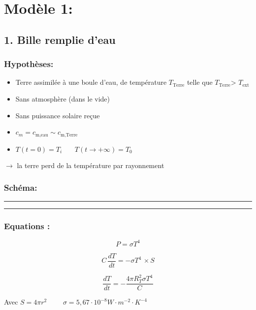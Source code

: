 \documentclass[a4paper,12pt]{article}
\begin{document}
\section*{Modèle 1:}
\subsection*{1. Bille remplie d'eau}
\subsubsection*{Hypothèses:}
\begin{itemize}
    \item Terre assimilée à une boule d'eau, de température \(T_{\text{Terre}}\) telle que \(T_{\text{Terre}}\)> \(T_{\text{ext}}\)
    \item  Sans atmosphère (dans le vide)
    \item  Sans puissance solaire reçue  
    \item \(c_{m}= c_{\text{m,eau}} \sim c_{\text{m,Terre}}\) 
    \item $T(t=0) = T_i$ \ \ \
$T(t \to +\infty) = T_0$
   
\end{itemize}
$\rightarrow$ la terre perd de la température par rayonnement
\\ 

\subsubsection*{Schéma:} 
\noindent\textcolor{gray}{\rule{\linewidth}{0.4pt}}

    
\begin{center}
  
\end{center}



\noindent\textcolor{gray}{\rule{\linewidth}{0.4pt}} 

\vspace{1em}

\subsubsection*{Equations :} 
\[   P= \sigma T^4 
\]

\[    C \, \frac{dT}{dt} = - \sigma T^4 \,  \times S
\]

\[\frac{dT}{dt} = - \frac{4 \pi R_T^2 \sigma T^4}{C}\]  

Avec 
\(S= 4\pi r^2\)
\ \ \ \
\(\sigma=5,67 \cdot 10^{-8} W\cdot m^{-2} \cdot K^{-4}\)
\end{document}
